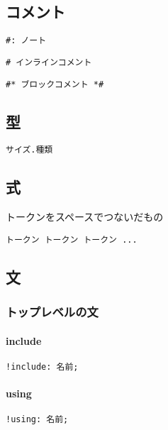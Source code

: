 \subsection{コメント}
\begin{lstlisting}[]
#: ノート
\end{lstlisting}
\begin{lstlisting}[]
# インラインコメント
\end{lstlisting}
\begin{lstlisting}[]
#* ブロックコメント *#
\end{lstlisting}
\subsection{型}
\begin{lstlisting}[]
サイズ.種類
\end{lstlisting}

\subsection{式}
トークンをスペースでつないだもの
\begin{lstlisting}[]
トークン トークン トークン ...
\end{lstlisting}

\subsection{文}
    \subsubsection{トップレベルの文}
        \paragraph{include}
\begin{lstlisting}[]
!include: 名前;
\end{lstlisting}
        \paragraph{using}
\begin{lstlisting}[]
!using: 名前;
\end{lstlisting}
